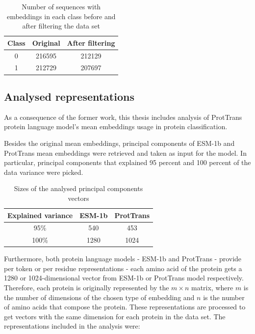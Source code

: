 \documentclass[12pt]{article}
\begin{document}
	\begin{table}[h!]
		\caption{Number of sequences with embeddings in each class 
		before and after filtering the data set}
		\vspace{0.2cm}
		\centering
		\begin{tabular}{ | c | c c | }
			\hline 
			Class & Original & After filtering \\
			\hline 
			0 & 216595 & 212129 \\
			1 & 212729 & 207697 \\
			\hline    
		\end{tabular}
		\label{table:numberEmbeddingsClasses}
	\end{table}

	\newpage

	\subsection{Analysed representations}
	\label{analysedRepresentations}

	As a consequence of the former work, this thesis includes 
	analysis of ProtTrans protein language model's mean embeddings 
	usage in protein classification. 

	Besides the original mean embeddings, principal components 
	of ESM-1b and ProtTrans
	mean embeddings were retrieved and taken as input for the 
	model. In particular, principal components that explained 
	95 percent and 100 percent of the data variance were picked.

	\begin{table}[h!]
		\caption{Sizes of the analysed principal components 
		vectors}
		\vspace{0.2cm}
		\centering
		\begin{tabular}{ | c | c c | }
			\hline 
			Explained variance & ESM-1b & ProtTrans \\
			\hline 
			95\% & 540 & 453 \\
			100\% & 1280 & 1024 \\
			\hline    
		\end{tabular}
		\label{table:vectorsPCADimensions}
	\end{table}
	
	Furthermore, both protein language models - ESM-1b and 
	ProtTrans - provide 
	per token or per residue representations - each 
	amino acid of the protein gets a 1280 or 1024-dimensional vector from
	ESM-1b or ProtTrans model respectively. Therefore, each protein is 
	originally represented by the ${m \times n}$ matrix, 
	where ${m}$ is the number of dimensions of the chosen type of embedding
	and ${n}$ is the number of amino acids that compose the protein. 
	These representations are processed to get vectors with the same 
	dimension 
	for each protein in the data set. The representations 
	included in the analysis were:
\end{document}

